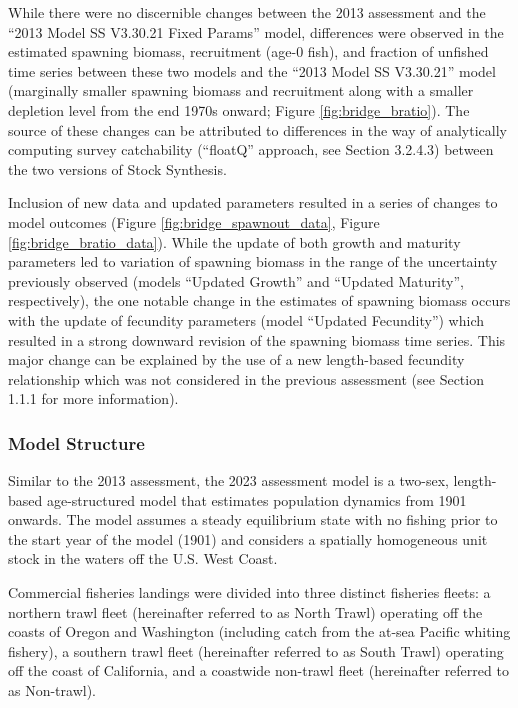 \documentclass[11pt,
  letterpaper,
]{article}
\begin{document}
While there were no discernible changes between the 2013 assessment and the ``2013 Model SS V3.30.21 Fixed Params'' model, differences were observed in the estimated spawning biomass, recruitment (age-0 fish), and fraction of unfished time series between these two models and the ``2013 Model SS V3.30.21'' model (marginally smaller spawning biomass and recruitment along with a smaller depletion level from the end 1970s onward; Figure \ref{fig:bridge_bratio}). The source of these changes can be attributed to differences in the way of analytically computing survey catchability (``floatQ'' approach, see Section 3.2.4.3) between the two versions of Stock Synthesis.

Inclusion of new data and updated parameters resulted in a series of changes to model outcomes (Figure \ref{fig:bridge_spawnout_data}, Figure \ref{fig:bridge_bratio_data}). While the update of both growth and maturity parameters led to variation of spawning biomass in the range of the uncertainty previously observed (models ``Updated Growth'' and ``Updated Maturity'', respectively), the one notable change in the estimates of spawning biomass occurs with the update of fecundity parameters (model ``Updated Fecundity'') which resulted in a strong downward revision of the spawning biomass time series. This major change can be explained by the use of a new length-based fecundity relationship which was not considered in the previous assessment (see Section 1.1.1 for more information).

\hypertarget{model-structure}{%
\subsubsection{Model Structure}\label{model-structure}}

Similar to the 2013 assessment, the 2023 assessment model is a two-sex, length-based age-structured model that estimates population dynamics from 1901 onwards. The model assumes a steady equilibrium state with no fishing prior to the start year of the model (1901) and considers a spatially homogeneous unit stock in the waters off the U.S. West Coast.

Commercial fisheries landings were divided into three distinct fisheries fleets: a northern trawl fleet (hereinafter referred to as North Trawl) operating off the coasts of Oregon and Washington (including catch from the at-sea Pacific whiting fishery), a southern trawl fleet (hereinafter referred to as South Trawl) operating off the coast of California, and a coastwide non-trawl fleet (hereinafter referred to as Non-trawl).
\end{document}
